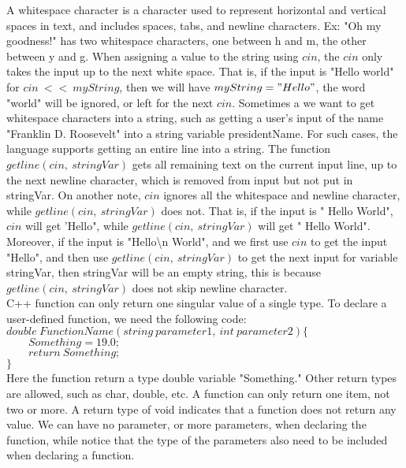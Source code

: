 \documentclass[11pt]{article}
\theoremstyle{break}
\theoremstyle{break}
\begin{document}
A whitespace character is a character used to represent horizontal and vertical spaces in text, and includes spaces, tabs, and newline characters. Ex: "Oh my goodness!" has two whitespace characters, one between h and m, the other between y and g. When assigning a value to the string using $cin$, the $cin$ only takes the input up to the next white space. That is, if the input is "Hello world" for $cin\ <<\ myString$, then we will have $myString = "Hello"$, the word "world" will be ignored, or left for the next $cin$. Sometimes a we want to get whitespace characters into a string, such as getting a user's input of the name "Franklin D. Roosevelt" into a string variable presidentName. For such cases, the language supports getting an entire line into a string. The function $getline(cin,\ stringVar)$ gets all remaining text on the current input line, up to the next newline character, which is removed from input but not put in stringVar. On another note, $cin$ ignores all the whitespace and newline character, while $getline(cin,\ stringVar)$ does not. That is, if the input is " Hello World", $cin$ will get 'Hello", while $getline(cin,\ stringVar)$ will get " Hello World". Moreover, if the input is "Hello\textbackslash n World", and we first use $cin$ to get the input "Hello", and then use $getline(cin,\ stringVar)$ to get the next input for variable stringVar, then stringVar will be an empty string, this is because $getline(cin,\ stringVar)$ does not skip newline character.\\



\newpage
C++ function can only return one singular value of a single type.
To declare a user-defined function, we need the following code:\\

$double\ FunctionName(string\ parameter1,\ int\ parameter2) \{$\\
${}\qquad   Something = 19.0;$\\
${}\qquad   return\ Something;$\\
$\}$\\

Here the function return a type double variable "Something." Other return types are allowed, such as char, double, etc. A function can only return one item, not two or more. A return type of void indicates that a function does not return any value. We can have no parameter, or more parameters, when declaring the function, while notice that the type of the parameters also need to be included when declaring a function. \\
\end{document}
